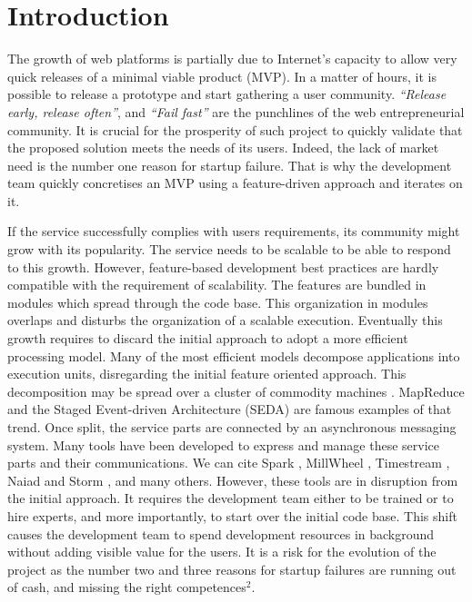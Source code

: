 \section{Introduction}

The growth of web platforms is partially due to Internet's capacity to allow very quick releases of a minimal viable product (MVP).
In a matter of hours, it is possible to release a prototype and start gathering a user community.
\textit{``Release early, release often''}, and \textit{``Fail fast''} are the punchlines of the web entrepreneurial community.
It is crucial for the prosperity of such project to quickly validate that the proposed solution meets the needs of its users.
Indeed, the lack of market need is the number one reason for startup failure.
That is why the development team quickly concretises an MVP using a feature-driven approach and iterates on it.

If the service successfully complies with users requirements, its community might grow with its popularity.
The service needs to be scalable to be able to respond to this growth.
However, feature-based development best practices are hardly compatible with the requirement of scalability.
The features are bundled in modules which spread through the code base.
This organization in modules overlaps and disturbs the organization of a scalable execution.
Eventually this growth requires to discard the initial approach to adopt a more efficient processing model.
Many of the most efficient models decompose applications into execution units, disregarding the initial feature oriented approach.
This decomposition may be spread over a cluster of commodity machines \cite{Fox1997}.
MapReduce \cite{Dean2008} and the Staged Event-driven Architecture (SEDA) \cite{Welsh2000} are famous examples of that trend. %
Once split, the service parts are connected by an asynchronous messaging system.
Many tools have been developed to express and manage these service parts and their communications.
We can cite Spark \cite{Zaharia2010}, MillWheel \cite{Akidau2013}, Timestream \cite{Qian2013}, Naiad \cite{McSherry} and Storm \cite{Toshniwal2014}, and many others.
However, these tools are in disruption from the initial approach.
It requires the development team either to be trained or to hire experts, and more importantly, to start over the initial code base.
This shift causes the development team to spend development resources in background without adding visible value for the users.
It is a risk for the evolution of the project as the number two and three reasons for startup failures are running out of cash, and missing the right competences$^2$.

